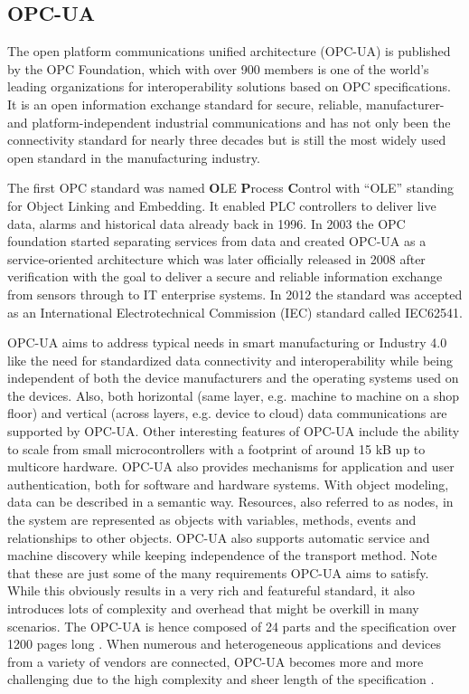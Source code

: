 \subsection{OPC-UA}
\label{subsection:opc-ua}
    The open platform communications unified architecture (OPC-UA) is published by the OPC Foundation, which with over 900 members is one of the world's leading organizations for interoperability solutions based on OPC specifications. It is an open information exchange standard for secure, reliable, manufacturer- and platform-independent industrial communications and has not only been the connectivity standard for nearly three decades but is still the most widely used open standard in the manufacturing industry. 

    The first OPC standard was named \textbf{O}LE \textbf{P}rocess \textbf{C}ontrol with ``OLE'' standing for Object Linking and Embedding. It enabled PLC controllers to deliver live data, alarms and historical data already back in 1996. In 2003 the OPC foundation started separating services from data and created OPC-UA as a service-oriented architecture which was later officially released in 2008 after verification with the goal to deliver a secure and reliable information exchange from sensors through to IT enterprise systems. In 2012 the standard was accepted as an International Electrotechnical Commission (IEC) standard called IEC62541.

    OPC-UA aims to address typical needs in smart manufacturing or Industry 4.0 like the need for standardized data connectivity and interoperability while being independent of both the device manufacturers and the operating systems used on the devices. Also, both horizontal (same layer, e.g. machine to machine on a shop floor) and vertical (across layers, e.g. device to cloud) data communications are supported by OPC-UA. Other interesting features of OPC-UA include the ability to scale from small microcontrollers with a footprint of around 15 kB up to multicore hardware. OPC-UA also provides mechanisms for application and user authentication, both for software and hardware systems. With object modeling, data can be described in a semantic way. Resources, also referred to as nodes, in the system are represented as objects with variables, methods, events and relationships to other objects. OPC-UA also supports automatic service and machine discovery while keeping independence of the transport method. Note that these are just some of the many requirements OPC-UA aims to satisfy. While this obviously results in a very rich and featureful standard, it also introduces lots of complexity and overhead that might be overkill in many scenarios. The OPC-UA is hence composed of 24 parts and the specification over 1200 pages long \cite{opc_foundation_interop}. When numerous and heterogeneous applications and devices from a variety of vendors are connected, OPC-UA becomes more and more challenging due to the high complexity and sheer length of the specification \cite{hivemq_opcua_vs_mqtt_sparkplug}.

